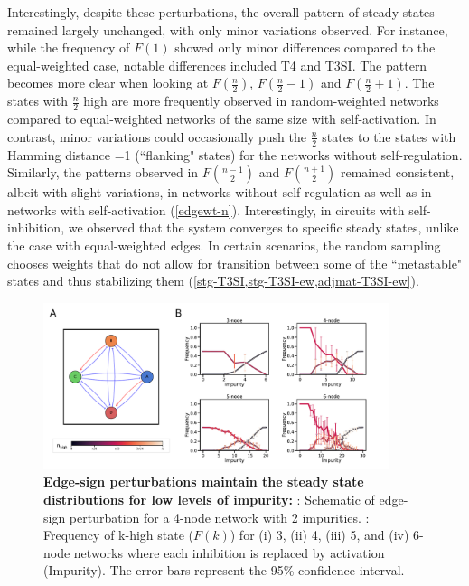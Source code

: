 \documentclass[11pt,a4paper]{article}
\theoremstyle{definition}
\theoremstyle{remark}
\begin{document}
Interestingly, despite these perturbations, the overall pattern of steady states remained largely unchanged, with only minor variations observed. For instance, while the frequency of $F(1)$ showed only minor differences compared to the equal-weighted case, notable differences included T4 and T3SI. The pattern becomes more clear when looking at $F(\frac{n}{2})$, $F(\frac{n}{2}-1)$ and $F(\frac{n}{2}+1)$. The states with $\frac{n}{2}$ high are more frequently observed in random-weighted networks compared to equal-weighted networks of the same size with self-activation. In contrast, minor variations could occasionally push the $\frac{n}{2}$ states to the states with Hamming distance =1 (``flanking" states) for the networks without self-regulation. Similarly, the patterns observed in $F(\frac{n-1}{2})$ and $F(\frac{n+1}{2})$ remained consistent, albeit with slight variations, in networks without self-regulation as well as in networks  with self-activation (\cref{edgewt-n}). Interestingly, in circuits with self-inhibition, we observed that the system converges to specific steady states, unlike the case with equal-weighted edges. In certain scenarios, the random sampling chooses weights that do not allow for transition between some of the ``metastable" states and thus stabilizing them (\cref{stg-T3SI,stg-T3SI-ew,adjmat-T3SI-ew}).

\begin{figure}[!ht]
    \begin{subfigure}[c]{\textwidth}
        \label{schematic-impuren}
    \end{subfigure}
    \begin{subfigure}[c]{\textwidth}
        \label{randn}
    \end{subfigure}
    \centering
    \includegraphics[width=0.9\textwidth]{figures/Figure3}
    \caption{\textbf{Edge-sign perturbations maintain the steady state distributions for low levels of impurity:} : Schematic of edge-sign perturbation for a 4-node network with 2 impurities. : Frequency of k-high state ($F(k)$) for (i) 3, (ii) 4, (iii) 5, and (iv) 6-node networks where each inhibition is replaced by activation (Impurity). The error bars represent the 95\% confidence interval.}
\end{figure}
\end{document}
